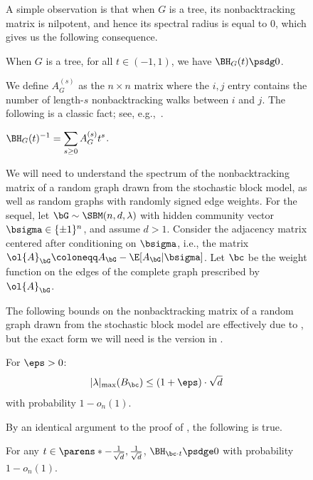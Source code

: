 \documentclass[11pt,letterpaper]{article}
\begin{document}
\begin{figure}
    A simple observation is that when $G$ is a tree, its nonbacktracking matrix is nilpotent, and hence its spectral radius is equal to $0$, which gives us the following consequence.
    \begin{corollary}
        \label{cor:bethe-tree-psd}
        When $G$ is a tree, for all $t\in(-1,1)$, we have $\BH_G(t)\psdg 0$.
    \end{corollary}

    We define $A_G^{(s)}$ as the $n\times n$ matrix where the $i,j$ entry contains the number of length-$s$ nonbacktracking walks between $i$ and $j$.
    The following is a classic fact; see, e.g.,~\cite[Equation (2.1)]{ST96}.

    \begin{fact}
        \label{fact:bethe-inverse}
        $\displaystyle \BH_G(t)^{-1} = \sum_{s\ge 0} A_G^{(s)}t^s$.
    \end{fact}

    We will need to understand the spectrum of the nonbacktracking matrix of a random graph drawn from the stochastic block model, as well as random graphs with randomly signed edge weights.
    For the sequel, let $\bG\sim\SBM(n,d,\lambda)$ with hidden community vector $\bsigma\in\{\pm1\}^n$, and assume $d > 1$.
    Consider the adjacency matrix centered after conditioning on $\bsigma$, i.e., the matrix $\ol{A}_{\bG} \coloneqq A_{\bG} - \E[A_{\bG}|\bsigma]$.
    Let $\bc$ be the weight function on the edges of the complete graph prescribed by $\ol{A}_{\bG}$.

    The following bounds on the nonbacktracking matrix of a random graph drawn from the stochastic block model are effectively due to \cite{BLM15}, but the exact form we will need is the version in \cite{LMR22}.
    \begin{lemma}
        For $\eps > 0$:
        \[
            |\lambda|_{\max}(B_{\bc}) \le (1+\eps)\cdot\sqrt{d}
        \]
        with probability $1-o_n(1)$.
    \end{lemma}

    By an identical argument to the proof of \cite[Theorem 5.1]{FM17}, the following is true.
    \begin{lemma}
        For any $t\in\parens*{-\frac{1}{\sqrt{d}},\frac{1}{\sqrt{d}}}$,
        \(
            \BH_{{\bc}\cdot t} \psdge 0
        \)
        with probability $1-o_n(1)$.
    \end{lemma}


\end{figure}
\end{document}
